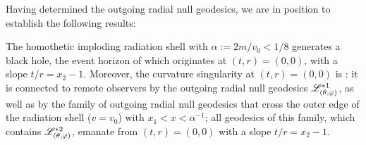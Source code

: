 Having determined the outgoing radial null geodesics, we are in position to establish
the following results:
\begin{prop}
The homothetic imploding radiation shell with $\alpha := 2m/v_0 < 1/8$
generates a black hole, the event horizon of which originates
at $(t,r) = (0, 0)$, with a slope $t/r = x_2 - 1$. Moreover, the curvature singularity at $(t,r)=(0,0)$
is : it is connected to remote observers
by the outgoing radial null geodesics $\mathscr{L}^{*1}_{(\theta,\varphi)}$, as well as
by the family of outgoing radial
null geodesics that cross the outer edge of the radiation shell ($v=v_0$) with
$x_1 < x < \alpha^{-1}$; all geodesics of this family, which contains
$\mathscr{L}^{*2}_{(\theta,\varphi)}$, emanate from $(t,r)=(0,0)$ with a slope $t/r = x_2 - 1$.
\end{prop}
